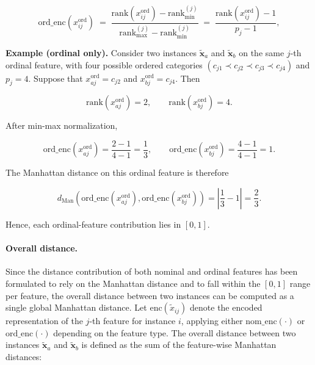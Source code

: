 \begin{equation}
  \mathrm{ord\_enc}(x^{\mathrm{ord}}_{ij}) \; = \; \frac{\mathrm{rank}(x^{\mathrm{ord}}_{ij})-\mathrm{rank}_{\min}^{(j)}}{\mathrm{rank}_{\max}^{(j)}-\mathrm{rank}_{\min}^{(j)}} \; = \; \frac{\mathrm{rank}(x^{\mathrm{ord}}_{ij})-1}{p_j - 1},
\end{equation}

\medskip

\noindent\textbf{Example (ordinal only).} Consider two instances $\tilde{\mathbf{x}}_a$ and $\tilde{\mathbf{x}}_b$ on the same $j$-th ordinal feature, with four possible ordered categories $(c_{j1} \prec c_{j2} \prec c_{j3} \prec c_{j4})$ and $p_j = 4$. Suppose that $x^{\mathrm{ord}}_{aj} = c_{j2}$ and $x^{\mathrm{ord}}_{bj} = c_{j4}$. Then

\begin{equation}
  \mathrm{rank}(x^{\mathrm{ord}}_{aj}) = 2, \qquad \mathrm{rank}(x^{\mathrm{ord}}_{bj}) = 4.
\end{equation}

After min-max normalization,

\begin{equation}
  \mathrm{ord\_enc}(x^{\mathrm{ord}}_{aj}) = \frac{2-1}{4-1} = \frac{1}{3}, \qquad \mathrm{ord\_enc}(x^{\mathrm{ord}}_{bj}) = \frac{4-1}{4-1} = 1.
\end{equation}

The Manhattan distance on this ordinal feature is therefore

\begin{equation}
  d_{\mathrm{Man}}\!\left(\mathrm{ord\_enc}(x^{\mathrm{ord}}_{aj}),\mathrm{ord\_enc}(x^{\mathrm{ord}}_{bj})\right)  = \left|\frac{1}{3}-1\right| = \frac{2}{3}.
\end{equation}

Hence, each ordinal-feature contribution lies in $[0,1]$.

\paragraph{Overall distance.} Since the distance contribution of both nominal and ordinal features has been formulated to rely on the Manhattan distance and to fall within the $[0,1]$ range per feature, the overall distance between two instances can be computed as a single global Manhattan distance. Let $\mathrm{enc}(\tilde{x}_{ij})$ denote the encoded representation of the $j$-th feature for instance $i$, applying either $\mathrm{nom\_enc}(\cdot)$ or $\mathrm{ord\_enc}(\cdot)$ depending on the feature type. The overall distance between two instances $\tilde{\mathbf{x}}_a$ and $\tilde{\mathbf{x}}_b$ is defined as the sum of the feature-wise Manhattan distances:

